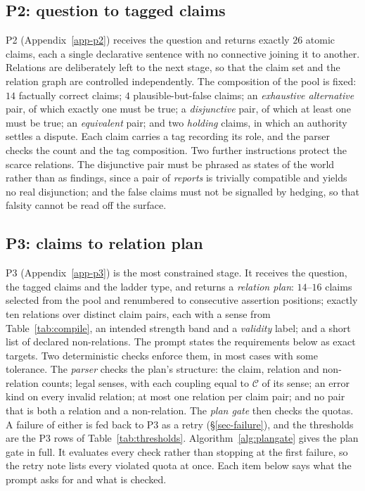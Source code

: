 \subsection{P2: question to tagged claims}
\label{sec-p2}

P2 (Appendix~\ref{app-p2}) receives the question and returns exactly $26$ atomic claims, each a single
declarative sentence with no connective joining it to another. Relations are deliberately left to the next
stage, so that the claim set and the relation graph are controlled independently. The composition of the pool is
fixed: $14$ factually correct claims; $4$ plausible-but-false claims; an \emph{exhaustive alternative} pair, of
which exactly one must be true; a \emph{disjunctive} pair, of which at least one must be true; an
\emph{equivalent} pair; and two \emph{holding} claims, in which an authority settles a dispute. Each claim carries
a tag recording its role, and the parser checks the count and the tag composition. Two further instructions
protect the scarce relations. The disjunctive pair must be phrased as states of the world rather than as findings,
since a pair of \emph{reports} is trivially compatible and yields no real disjunction; and the false claims must
not be signalled by hedging, so that falsity cannot be read off the surface.

\subsection{P3: claims to relation plan}
\label{sec-p3}

P3 (Appendix~\ref{app-p3}) is the most constrained stage. It receives the question, the tagged claims and the
ladder type, and returns a \emph{relation plan}: $14$--$16$ claims selected from the pool and renumbered to
consecutive assertion positions; exactly ten relations over distinct claim pairs, each with a sense from
Table~\ref{tab:compile}, an intended strength band and a \emph{validity} label; and a short list of declared
non-relations. The prompt states the requirements below as exact targets. Two deterministic checks enforce them,
in most cases with some tolerance. The \emph{parser} checks the plan's structure: the claim, relation and
non-relation counts; legal senses, with each coupling equal to $\mathcal{C}$ of its sense; an error kind on every
invalid relation; at most one relation per claim pair; and no pair that is both a relation and a non-relation.
The \emph{plan gate} then checks the quotas. A failure of either is fed back to P3 as a retry
(\S\ref{sec-failure}), and the thresholds are the P3 rows of Table~\ref{tab:thresholds}.
Algorithm~\ref{alg:plangate} gives the plan gate in full. It evaluates every check rather than stopping at the
first failure, so the retry note lists every violated quota at once. Each item below says what the prompt asks
for and what is checked.

